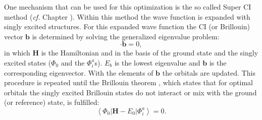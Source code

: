 One mechanism that can be used for this optimization is the so called Super CI \cite{superci1,superci2} method (\textit{cf.} Chapter \chorbopt). Within this method the wave function is expanded with singly excited structures. For this expanded wave function the CI (or Brillouin) vector $\mathbf{b}$ is determined by solving the generalized eigenvalue problem:
\begin{equation}
[\mathbf{H}-E_b] \cdot \mathbf{b} = 0,
\label{ch1.eq.geig}
\end{equation}
in which $\mathbf{H}$ is the Hamiltonian and in the basis of the ground state and the singly excited states ($\Phi_0$ and the $\Phi_{i}^{a}$s). $E_b$ is the lowest eigenvalue and $\mathbf{b}$ is the corresponding eigenvector. With the elements of $\mathbf{b}$ the orbitals are updated. This procedure is repeated until the Brillouin theorem \cite{brillouin}, which states that for optimal orbitals the singly excited Brillouin states do not interact or mix with the ground (or reference) state, is fulfilled:
\begin{equation}
\left < \Phi_0 | \mathbf{H} - E_0 | \Phi_{i}^{a} \right > = 0.
\label{ch1.eq.brillouin}
\end{equation}

